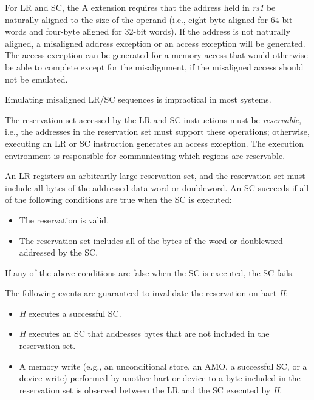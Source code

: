 For LR and SC, the A extension requires that the address held in {\em
  rs1} be naturally aligned to the size of the operand (i.e.,
eight-byte aligned for 64-bit words and four-byte aligned for 32-bit
words).  If the address is not naturally aligned, a misaligned address
exception or an access exception will be generated.  The access
exception can be generated for a memory access that would otherwise be
able to complete except for the misalignment, if the misaligned access
should not be emulated.

\begin{commentary}
Emulating misaligned LR/SC sequences is impractical in most systems.
\end{commentary}

The reservation set accessed by the LR and SC instructions must be {\em
reservable}, i.e., the addresses in the reservation set must support these
operations; otherwise, executing an LR or SC instruction generates an access
exception.  The execution environment is responsible for communicating which
regions are reservable.

An LR registers an arbitrarily large reservation set, and the reservation set
must include all bytes of the addressed data word or doubleword.  An SC
succeeds if all of the following conditions are true when the SC is executed:
\vspace{-0.2in}
\begin{itemize}
\parskip 0pt
\itemsep 1pt
\item The reservation is valid.
\item The reservation set includes all of the bytes of the word or doubleword
addressed by the SC.
\end{itemize}
If any of the above conditions are false when the SC is executed, the SC fails.

The following events are guaranteed to invalidate the reservation on hart
{\em H}:
\vspace{-0.2in}
\begin{itemize}
\parskip 0pt
\itemsep 1pt
\item {\em H} executes a successful SC.
\item {\em H} executes an SC that addresses bytes that are not included in the
reservation set.
\item A memory write (e.g., an unconditional store, an AMO, a
successful SC, or a device write) performed by another hart or device to a byte
included in the reservation set is observed between the LR and the SC executed
by {\em H}.
\end{itemize}

